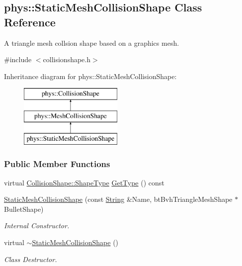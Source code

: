 \hypertarget{classphys_1_1StaticMeshCollisionShape}{
\subsection{phys::StaticMeshCollisionShape Class Reference}
\label{classphys_1_1StaticMeshCollisionShape}
}


A triangle mesh collsion shape based on a graphics mesh.  




{\ttfamily \#include $<$collisionshape.h$>$}

Inheritance diagram for phys::StaticMeshCollisionShape:\begin{figure}[H]
\begin{center}
\leavevmode
\includegraphics[height=3.000000cm]{classphys_1_1StaticMeshCollisionShape}
\end{center}
\end{figure}
\subsubsection*{Public Member Functions}
\begin{DoxyCompactItemize}
\item 
virtual \hyperlink{classphys_1_1CollisionShape_af3ba4fd8af5b9557f912d2f5ff35a588}{CollisionShape::ShapeType} \hyperlink{classphys_1_1StaticMeshCollisionShape_ae89718d0c982ad83050971d2965ce3ce}{GetType} () const 
\item 
\hyperlink{classphys_1_1StaticMeshCollisionShape_a1de8ba7849a90368dd601d10917c1a0c}{StaticMeshCollisionShape} (const \hyperlink{namespacephys_aa03900411993de7fbfec4789bc1d392e}{String} \&Name, btBvhTriangleMeshShape $\ast$BulletShape)
\begin{DoxyCompactList}\small\item\em Internal Constructor. \item\end{DoxyCompactList}\item 
\hypertarget{classphys_1_1StaticMeshCollisionShape_abbb62e0fb83bc089a2588f9c3d71cefc}{
virtual \hyperlink{classphys_1_1StaticMeshCollisionShape_abbb62e0fb83bc089a2588f9c3d71cefc}{$\sim$StaticMeshCollisionShape} ()}
\label{classphys_1_1StaticMeshCollisionShape_abbb62e0fb83bc089a2588f9c3d71cefc}

\begin{DoxyCompactList}\small\item\em Class Destructor. \item\end{DoxyCompactList}\end{DoxyCompactItemize}

